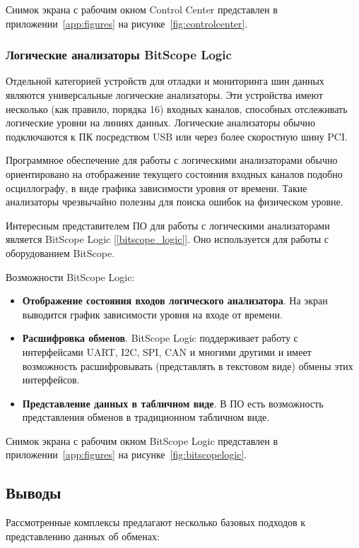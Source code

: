Снимок экрана с рабочим окном Control Center представлен в приложении~\ref{app:figures} на рисунке~\ref{fig:controlcenter}.

\subsubsection{Логические анализаторы BitScope Logic}

Отдельной категорией устройств для отладки и мониторинга шин данных являются универсальные логические анализаторы. Эти устройства имеют несколько (как правило, порядка 16) входных каналов, способных отслеживать логические уровни на линиях данных. Логические анализаторы обычно подключаются к ПК посредством USB или через более скоростную шину PCI.

Программное обеспечение для работы с логическими анализаторами обычно ориентировано на отображение текущего состояния входных каналов подобно осциллографу, в виде графика зависимости уровня от времени. Такие анализаторы чрезвычайно полезны для поиска ошибок на физическом уровне.

Интересным представителем ПО для работы с логическими анализаторами является BitScope Logic [\ref{bitscope_logic}]. Оно используется для работы с оборудованием BitScope.

Возможности BitScope Logic:
\begin{itemize}
 \item \textbf{Отображение состояния входов логического анализатора}. На экран выводится график зависимости уровня на входе от времени.
 \item \textbf{Расшифровка обменов}. BitScope Logic поддерживает работу с интерфейсами UART, I2C, SPI, CAN и многими другими и имеет возможность расшифровывать (представлять в текстовом виде) обмены этих интерфейсов.
 \item \textbf{Представление данных в табличном виде}. В ПО есть возможность представления обменов в традиционном табличном виде.
\end{itemize}

Снимок экрана с рабочим окном BitScope Logic представлен в приложении~\ref{app:figures} на рисунке~\ref{fig:bitscopelogic}.

\subsection{Выводы}

Рассмотренные комплексы предлагают несколько базовых подходов к представлению данных об обменах:

